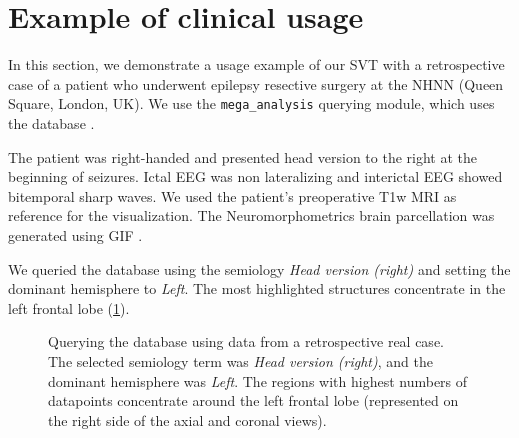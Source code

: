 \section{Example of clinical usage}


In this section, we demonstrate a usage example of our \ac{SVT} with a retrospective case of a patient who underwent epilepsy resective surgery at the \ac{NHNN} (Queen Square, London, UK).
We use the \texttt{mega\_analysis} querying module, which uses the \svtdatabase database \cite{alim-marvasti_mapping_2021,alim-marvasti_probabilistic_2021}.

The patient was right-handed and presented head version to the right at the beginning of seizures.
Ictal \ac{EEG} was non lateralizing and interictal \ac{EEG} showed bitemporal sharp waves.
We used the patient's preoperative \ac{T1w} \ac{MRI} as reference for the visualization.
The Neuromorphometrics brain parcellation was generated using \ac{GIF} \cite{cardoso_geodesic_2015}.

We queried the database using the semiology \textit{Head version (right)} and setting the dominant hemisphere to \textit{Left}.
The most highlighted structures concentrate in the left frontal lobe (\cref{fig:svt_case_heatmap}).

\begin{figure}
  \centering
  \caption[Querying the database using a retrospective real case]{
    Querying the database using data from a retrospective real case.
    The selected semiology term was \textit{Head version (right)}, and the dominant hemisphere was \textit{Left}.
    The regions with highest numbers of datapoints concentrate around the left frontal lobe (represented on the right side of the axial and coronal views).
  }
  \label{fig:svt_case_heatmap}
\end{figure}

